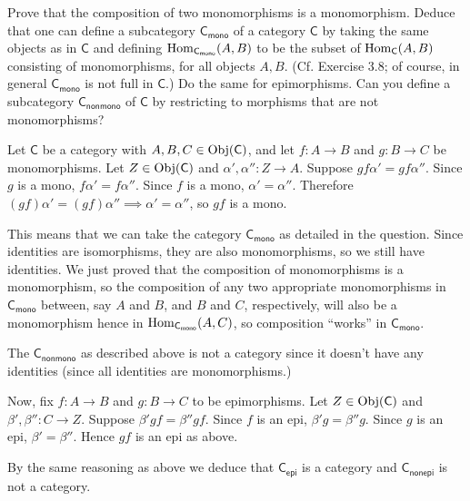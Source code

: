 \begin{problem}[4.4]
	Prove that the composition of two monomorphisms is a monomorphism. Deduce that
	one can define a subcategory $\mathsf{C}_\mathsf{mono}$ of a category $\mathsf{C}$ by taking the same
	objects as in $\mathsf{C}$ and defining $\mathrm{Hom}_{\mathsf{C}_\mathsf{mono}}(A, B)$ to be the subset of
	$\mathrm{Hom}_\mathsf{C}(A, B)$ consisting of monomorphisms, for all objects $A, B$. (Cf.
	Exercise 3.8; of course, in general $\mathsf{C}_\mathsf{mono}$ is not full in $\mathsf{C}$.) Do the same
	for epimorphisms. Can you define a subcategory $\mathsf{C}_\mathsf{nonmono}$ of $\mathsf{C}$ by
	restricting to morphisms that are not monomorphisms?
\end{problem}
\begin{solution}
	Let $\mathsf{C}$ be a category with $A,B,C\in \mathrm{Obj}(\mathsf{C})$, and let $f:A\to B$ and $g:B\to
	C$ be monomorphisms. Let $Z\in\mathrm{Obj}(\mathsf{C})$ and $\alpha',\alpha'':Z\to A$. Suppose
	$gf\alpha'=gf\alpha''$. Since $g$ is a mono, $f\alpha'=f\alpha''$. Since $f$ is
	a mono, $\alpha'=\alpha''$. Therefore $(gf)\alpha'=(gf)\alpha'' \implies
	\alpha'=\alpha''$, so $gf$ is a mono.
	
	This means that we can take the category $\mathsf{C}_\mathsf{mono}$ as detailed in the question.
	Since identities are isomorphisms, they are also monomorphisms, so we still have
	identities. We just proved that the composition of monomorphisms is a
	monomorphism, so the composition of any two appropriate monomorphisms in
	$\mathsf{C}_\mathsf{mono}$ between, say $A$ and $B$, and $B$ and $C$, respectively, will also be
	a monomorphism hence in $\mathrm{Hom}_{\mathsf{C}_\mathsf{mono}}(A,C)$, so composition ``works'' in
	$\mathsf{C}_\mathsf{mono}$.
	
	The $\mathsf{C}_\mathsf{nonmono}$ as described above is not a category since it doesn't have any
	identities (since all identities are monomorphisms.)
	
	Now, fix $f:A\to B$ and $g:B\to C$ to be epimorphisms. Let $Z\in\mathrm{Obj}(\mathsf{C})$ and
	$\beta',\beta'':C\to Z$. Suppose $\beta'gf=\beta''gf$. Since $f$ is an epi,
	$\beta'g=\beta''g$. Since $g$ is an epi, $\beta'=\beta''$. Hence $gf$ is an epi
	as above.
	
	By the same reasoning as above we deduce that $\mathsf{C}_\mathsf{epi}$ is a category and
	$\mathsf{C}_\mathsf{nonepi}$ is not a category.
\end{solution}


